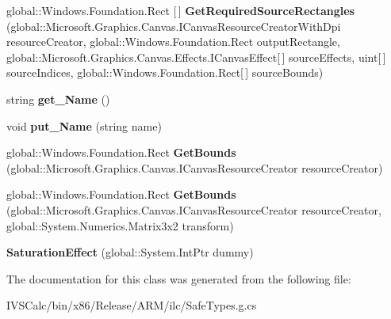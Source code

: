 \begin{DoxyCompactItemize}
\mbox{\label{class_microsoft_1_1_graphics_1_1_canvas_1_1_effects_1_1_saturation_effect_ab7f0bcb474d8d21179094638fc4471f8}} 
global\+::\+Windows.\+Foundation.\+Rect \mbox{[}$\,$\mbox{]} {\bfseries Get\+Required\+Source\+Rectangles} (global\+::\+Microsoft.\+Graphics.\+Canvas.\+I\+Canvas\+Resource\+Creator\+With\+Dpi resource\+Creator, global\+::\+Windows.\+Foundation.\+Rect output\+Rectangle, global\+::\+Microsoft.\+Graphics.\+Canvas.\+Effects.\+I\+Canvas\+Effect\mbox{[}$\,$\mbox{]} source\+Effects, uint\mbox{[}$\,$\mbox{]} source\+Indices, global\+::\+Windows.\+Foundation.\+Rect\mbox{[}$\,$\mbox{]} source\+Bounds)
\item 
\mbox{\label{class_microsoft_1_1_graphics_1_1_canvas_1_1_effects_1_1_saturation_effect_a09fefba06a2f595c3287b69efec44cfc}} 
string {\bfseries get\+\_\+\+Name} ()
\item 
\mbox{\label{class_microsoft_1_1_graphics_1_1_canvas_1_1_effects_1_1_saturation_effect_a75e5c594818787dec8f9e5c865c4a389}} 
void {\bfseries put\+\_\+\+Name} (string name)
\item 
\mbox{\label{class_microsoft_1_1_graphics_1_1_canvas_1_1_effects_1_1_saturation_effect_a9e93fb236e2040b475454b5f25010bb4}} 
global\+::\+Windows.\+Foundation.\+Rect {\bfseries Get\+Bounds} (global\+::\+Microsoft.\+Graphics.\+Canvas.\+I\+Canvas\+Resource\+Creator resource\+Creator)
\item 
\mbox{\label{class_microsoft_1_1_graphics_1_1_canvas_1_1_effects_1_1_saturation_effect_a2b3ce52e2f92f4bc5f5ddcfcc4d2c59c}} 
global\+::\+Windows.\+Foundation.\+Rect {\bfseries Get\+Bounds} (global\+::\+Microsoft.\+Graphics.\+Canvas.\+I\+Canvas\+Resource\+Creator resource\+Creator, global\+::\+System.\+Numerics.\+Matrix3x2 transform)
\item 
\mbox{\label{class_microsoft_1_1_graphics_1_1_canvas_1_1_effects_1_1_saturation_effect_a90ee1fdca66c9104b64434044492ea57}} 
{\bfseries Saturation\+Effect} (global\+::\+System.\+Int\+Ptr dummy)
\end{DoxyCompactItemize}


The documentation for this class was generated from the following file\+:\begin{DoxyCompactItemize}
\item 
I\+V\+S\+Calc/bin/x86/\+Release/\+A\+R\+M/ilc/Safe\+Types.\+g.\+cs\end{DoxyCompactItemize}
